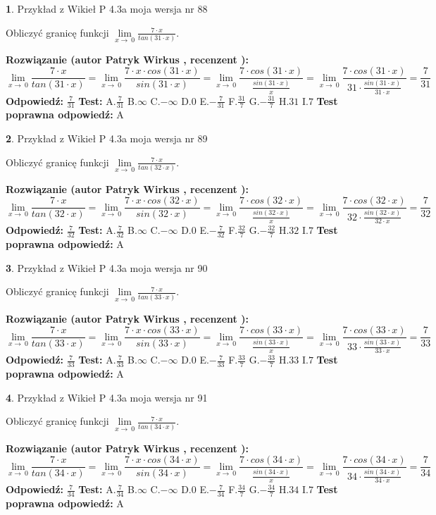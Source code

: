 \documentclass[12pt, a4paper]{article}
\theoremstyle{definition} %
\newtheorem{zad}{}
\newcommand{\zadStart}[1]{\begin{zad}#1\newline}
\newcommand{\zadStop}{\end{zad}}
\newcommand{\rozwStart}[2]{\noindent \textbf{Rozwiązanie (autor #1 , recenzent #2): }\newline}
\newcommand{\rozwStop}{\newline}
\newcommand{\odpStart}{\noindent \textbf{Odpowiedź:}\newline}
\newcommand{\odpStop}{\newline}
\newcommand{\testStart}{\noindent \textbf{Test:}\newline}
\newcommand{\testStop}{\newline}
\newcommand{\kluczStart}{\noindent \textbf{Test poprawna odpowiedź:}\newline}
\newcommand{\kluczStop}{\newline}
\begin{document}
\zadStart{Przykład z Wikieł P 4.3a moja wersja nr 88}


Obliczyć granicę funkcji $\lim\limits_{x\to\ 0}\frac{7 \cdot x}{tan(31 \cdot x)}$.
\zadStop
\rozwStart{Patryk Wirkus}{}
$$\lim\limits_{x\to\ 0}\frac{7 \cdot x}{tan(31 \cdot x)}=\lim\limits_{x\to\ 0}\frac{7 \cdot x \cdot cos(31 \cdot x)}{sin(31 \cdot x)}=\lim\limits_{x\to\ 0}\frac{7 \cdot cos(31 \cdot x)}{\frac{sin(31 \cdot x)}{x}}=\lim\limits_{x\to\ 0}\frac{7 \cdot cos(31 \cdot x)}{31 \cdot \frac{sin(31 \cdot x)}{31 \cdot x}} = \frac{7}{31}$$
\rozwStop
\odpStart
$\frac{7}{31}$
\odpStop
\testStart
A.$\frac{7}{31}$
B.$\infty$
C.$-\infty$
D.$0$
E.$-\frac{7}{31}$
F.$\frac{31}{7}$
G.$-\frac{31}{7}$
H.$31$
I.$7$
\testStop
\kluczStart
A
\kluczStop



\zadStart{Przykład z Wikieł P 4.3a moja wersja nr 89}


Obliczyć granicę funkcji $\lim\limits_{x\to\ 0}\frac{7 \cdot x}{tan(32 \cdot x)}$.
\zadStop
\rozwStart{Patryk Wirkus}{}
$$\lim\limits_{x\to\ 0}\frac{7 \cdot x}{tan(32 \cdot x)}=\lim\limits_{x\to\ 0}\frac{7 \cdot x \cdot cos(32 \cdot x)}{sin(32 \cdot x)}=\lim\limits_{x\to\ 0}\frac{7 \cdot cos(32 \cdot x)}{\frac{sin(32 \cdot x)}{x}}=\lim\limits_{x\to\ 0}\frac{7 \cdot cos(32 \cdot x)}{32 \cdot \frac{sin(32 \cdot x)}{32 \cdot x}} = \frac{7}{32}$$
\rozwStop
\odpStart
$\frac{7}{32}$
\odpStop
\testStart
A.$\frac{7}{32}$
B.$\infty$
C.$-\infty$
D.$0$
E.$-\frac{7}{32}$
F.$\frac{32}{7}$
G.$-\frac{32}{7}$
H.$32$
I.$7$
\testStop
\kluczStart
A
\kluczStop



\zadStart{Przykład z Wikieł P 4.3a moja wersja nr 90}


Obliczyć granicę funkcji $\lim\limits_{x\to\ 0}\frac{7 \cdot x}{tan(33 \cdot x)}$.
\zadStop
\rozwStart{Patryk Wirkus}{}
$$\lim\limits_{x\to\ 0}\frac{7 \cdot x}{tan(33 \cdot x)}=\lim\limits_{x\to\ 0}\frac{7 \cdot x \cdot cos(33 \cdot x)}{sin(33 \cdot x)}=\lim\limits_{x\to\ 0}\frac{7 \cdot cos(33 \cdot x)}{\frac{sin(33 \cdot x)}{x}}=\lim\limits_{x\to\ 0}\frac{7 \cdot cos(33 \cdot x)}{33 \cdot \frac{sin(33 \cdot x)}{33 \cdot x}} = \frac{7}{33}$$
\rozwStop
\odpStart
$\frac{7}{33}$
\odpStop
\testStart
A.$\frac{7}{33}$
B.$\infty$
C.$-\infty$
D.$0$
E.$-\frac{7}{33}$
F.$\frac{33}{7}$
G.$-\frac{33}{7}$
H.$33$
I.$7$
\testStop
\kluczStart
A
\kluczStop



\zadStart{Przykład z Wikieł P 4.3a moja wersja nr 91}


Obliczyć granicę funkcji $\lim\limits_{x\to\ 0}\frac{7 \cdot x}{tan(34 \cdot x)}$.
\zadStop
\rozwStart{Patryk Wirkus}{}
$$\lim\limits_{x\to\ 0}\frac{7 \cdot x}{tan(34 \cdot x)}=\lim\limits_{x\to\ 0}\frac{7 \cdot x \cdot cos(34 \cdot x)}{sin(34 \cdot x)}=\lim\limits_{x\to\ 0}\frac{7 \cdot cos(34 \cdot x)}{\frac{sin(34 \cdot x)}{x}}=\lim\limits_{x\to\ 0}\frac{7 \cdot cos(34 \cdot x)}{34 \cdot \frac{sin(34 \cdot x)}{34 \cdot x}} = \frac{7}{34}$$
\rozwStop
\odpStart
$\frac{7}{34}$
\odpStop
\testStart
A.$\frac{7}{34}$
B.$\infty$
C.$-\infty$
D.$0$
E.$-\frac{7}{34}$
F.$\frac{34}{7}$
G.$-\frac{34}{7}$
H.$34$
I.$7$
\testStop
\kluczStart
A
\kluczStop
\end{document}
